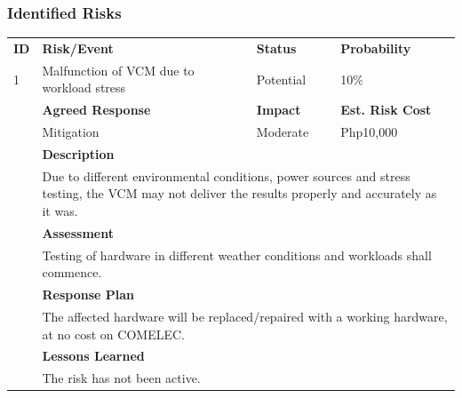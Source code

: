 \documentclass[a4paper, 11pt]{article}
\begin{document}
\subsubsection{Identified Risks}
\begin{table}[H]
	\begin{tabular}{l|l l l}
		\textbf{ID} & \textbf{Risk/Event} & \textbf{Status} & \textbf{Probability}\\
		1 & Malfunction of VCM due to workload stress & Potential & 10\% \\
		  & \textbf{Agreed Response} & \textbf{Impact} & \textbf{Est. Risk Cost} \\
		  & Mitigation & Moderate & Php10,000 \\
		  & \textbf{Description} \\
		  & \multicolumn{3}{p{\linewidth}}{Due to different environmental conditions, power sources and stress testing, the VCM may not deliver the results properly and accurately as it was.} \\
		  & \textbf{Assessment} \\
		  & \multicolumn{3}{p{\linewidth}}{Testing of hardware in different weather conditions and workloads shall commence.} \\
		  & \textbf{Response Plan} \\
		  & \multicolumn{3}{p{\linewidth}}{The affected hardware will be replaced/repaired with a working hardware, at no cost on COMELEC.} \\
		  & \textbf{Lessons Learned} \\
		  & The risk has not been active. \\
		\hline
		

\end{tabular}
\end{table}
\end{document}
